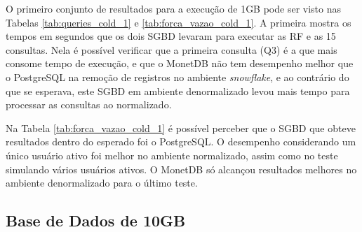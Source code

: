 O primeiro conjunto de resultados para a execução de 1GB pode ser visto nas Tabelas \ref{tab:queries_cold_1} e \ref{tab:forca_vazao_cold_1}. A primeira mostra os tempos em segundos que os dois SGBD levaram para executar as RF e as 15 consultas. Nela é possível verificar que a primeira consulta (Q3) é a que mais consome tempo de execução, e que o MonetDB não tem desempenho melhor que o PostgreSQL na remoção de registros no ambiente \textit{snowflake}, e ao contrário do que se esperava, este SGBD em ambiente denormalizado levou mais tempo para processar as consultas ao normalizado. 



Na Tabela \ref{tab:forca_vazao_cold_1} é possível perceber que o SGBD que obteve resultados dentro do esperado foi o PostgreSQL. O desempenho considerando um único usuário ativo foi melhor no ambiente normalizado, assim como no teste simulando vários usuários ativos. O MonetDB só alcançou resultados melhores no ambiente denormalizado para o último teste.



\subsection{Base de Dados de 10GB}

